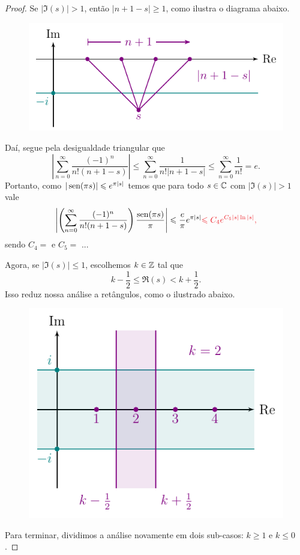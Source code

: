 \begin{proof}
        Se $|\Im(s)| > 1$, então $|n+1-s| \geq 1$, como ilustra o diagrama abaixo.
        \begin{figure}[H]\centering
            \includegraphics{Figuras/Im(s)>1.pdf}
        \end{figure}
        Daí, segue pela desigualdade triangular que
        \[
        \left| \sum_{n=0}^{\infty} \frac{(-1)^n}{n!(n+1-s)} \right| 
        \leq \sum_{n=0}^{\infty} \frac{1}{n!|n+1-s|} 
        \leq \sum_{n=0}^{\infty} \frac{1}{n!}
        = e.
        \]
        Portanto, como $|\operatorname{sen}(\pi s)| \leqslant e^{\pi |s|}$ temos que para todo $s\in\mathbb{C}$ com $|\Im(s)|>1$
        vale
        \[
        \left| \left(\sum_{n=0}^{\infty} \frac{(-1)^n}{n!(n+1-s)}\right)\frac{\sen(\pi s)}{\pi} \right|
        \leq \frac{e}{\pi} e^{\pi |s|}
        \red{\leq C_4e^{C_5|s|\ln|s|}},
        \]
        sendo $C_4 = $ e $C_5 = $ ...
        
        Agora, se $|\Im(s)| \leq 1$, escolhemos $k\in\mathbb{Z}$ tal que
        \[
        k - \frac{1}{2} \leq \Re(s) < k + \frac{1}{2}.
        \]
        Isso reduz nossa análise a retângulos, como o ilustrado abaixo.
        \begin{figure}[H]\centering
            \includegraphics{Figuras/K>=1.pdf}
        \end{figure}
        Para terminar, dividimos a análise novamente em dois sub-casos: $k\geq 1$ e $k\leq 0$.
        

\end{proof}
